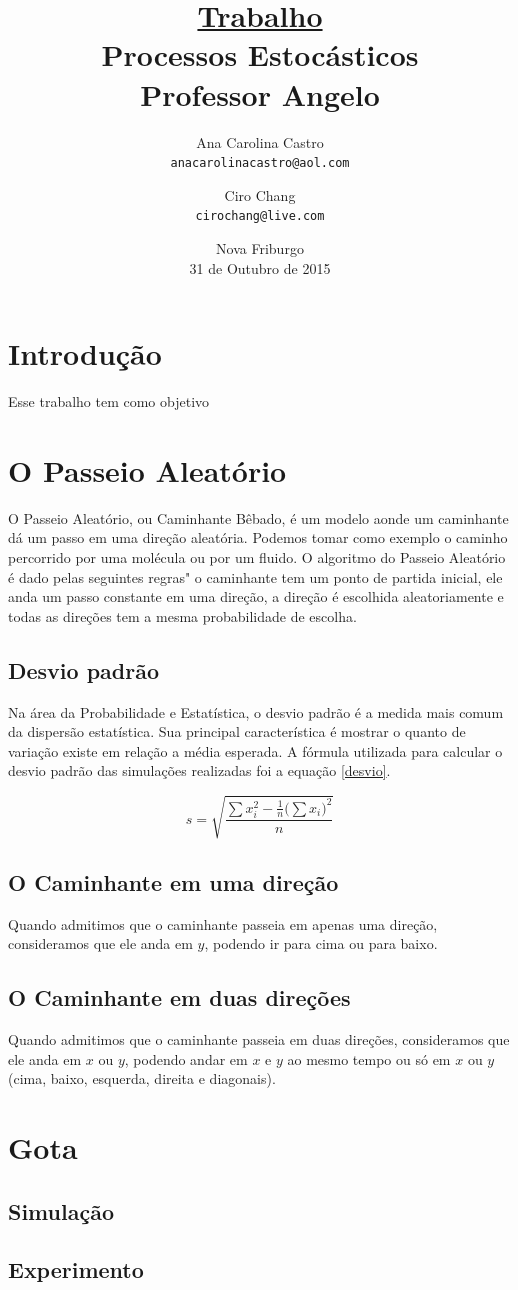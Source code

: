 \documentclass[12pt,a4paper]{article}
\title{\textbf{\underline{Trabalho}\\[0.5cm]
Processos Estocásticos}\\[0.3cm]\large{Professor Angelo}\\[1.5cm]}
\author{
	Ana Carolina Castro\\
	\texttt{anacarolinacastro@aol.com}
	\and
	Ciro Chang\\
	\texttt{cirochang@live.com}
	\\[1.5cm]
}
\date{Nova Friburgo\\31 de Outubro de 2015}
\begin{document}
\maketitle
\thispagestyle{empty}

\newpage
\tableofcontents

\newpage
\section{Introdução}
Esse trabalho tem como objetivo 

\newpage
\section{O Passeio Aleatório}
O Passeio Aleatório, ou Caminhante Bêbado, é um modelo aonde um caminhante dá um passo em uma direção aleatória. Podemos tomar como exemplo o caminho percorrido por uma molécula ou por um fluido. O algoritmo do Passeio Aleatório é dado pelas seguintes regras" o caminhante tem um ponto de partida inicial, ele anda um passo constante em uma direção, a direção é escolhida aleatoriamente e todas as direções tem a mesma probabilidade de escolha.



\subsection{Desvio padrão}
Na área da Probabilidade e Estatística, o desvio padrão é a medida mais comum da dispersão estatística. Sua principal característica é mostrar o quanto de variação existe em relação a média esperada. A fórmula utilizada para calcular o desvio padrão das simulações realizadas foi a equação \ref{desvio}.

\begin{equation}
\label{desvio}
s = \sqrt{\frac{\sum{x_i^2} - \frac{1}{n}(\sum{x_i)^2}}{n}}
\end{equation}

\subsection{O Caminhante em uma direção}
Quando admitimos que o caminhante passeia em apenas uma direção, consideramos que ele anda em $y$, podendo ir para cima ou para baixo.

\subsection{O Caminhante em duas direções}
Quando admitimos que o caminhante passeia em duas direções, consideramos que ele anda em $x$ ou $y$, podendo andar em $x$ e $y$ ao mesmo tempo ou só em $x$ ou $y$ (cima, baixo, esquerda, direita e diagonais).


\newpage
\section{Gota}
\subsection{Simulação}

\subsection{Experimento}
\end{document}
